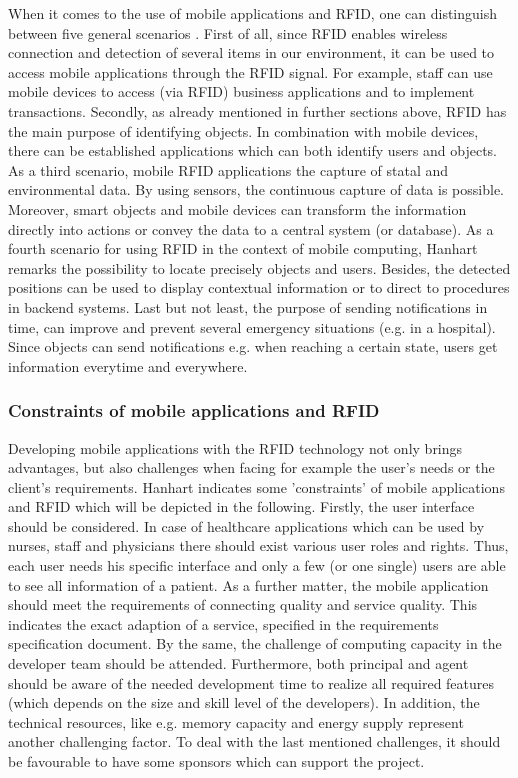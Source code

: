 When it comes to the use of mobile applications and RFID, one can distinguish between five general scenarios \cite[p.13 ff.]{mobile}. First of all, since RFID enables wireless connection and detection of several items in our environment, it can be used to access mobile applications through the RFID signal. For example, staff can use mobile devices to access (via RFID) business applications and to implement transactions. Secondly, as already mentioned in further sections above, RFID has the main purpose of identifying objects. In combination with mobile devices, there can be established applications which can both identify users and objects. As a third scenario, mobile RFID applications the capture of statal and environmental data. By using sensors, the continuous capture of data is possible. Moreover, smart objects and mobile devices can transform the information directly into actions or convey the data to a central system (or database). As a fourth scenario for using RFID in the context of mobile computing, Hanhart \cite[p.13 ff.]{mobile} remarks the possibility to locate precisely objects and users. Besides, the detected positions can be used to display contextual information or to direct to procedures in backend systems. Last but not least, the purpose of sending notifications in time, can improve and prevent several emergency situations (e.g. in a hospital). Since objects can send notifications e.g. when reaching a certain state, users get information everytime and everywhere.  

\subsubsection{Constraints of mobile applications and RFID}

Developing mobile applications with the RFID technology not only brings advantages, but also challenges when facing for example the user's needs or the client's requirements. Hanhart indicates some 'constraints' of mobile applications and RFID \cite[p.16 ff.]{mobile} which will be depicted in the following. Firstly, the user interface should be considered. In case of healthcare applications which can be used by nurses, staff and physicians there should exist various user roles and rights. Thus, each user needs his specific interface and only a few (or one single) users are able to see all information of a patient. As a further matter, the mobile application should meet the requirements of connecting quality and service quality. This indicates the exact adaption of a service, specified in the requirements specification document. By the same, the challenge of computing capacity in the developer team should be attended. Furthermore, both principal and agent should be aware of the needed development time to realize all required features (which depends on the size and skill level of the developers). In addition, the technical resources, like e.g. memory capacity and energy supply represent another challenging factor. To deal with the last mentioned challenges, it should be favourable to have some sponsors which can support the project.

